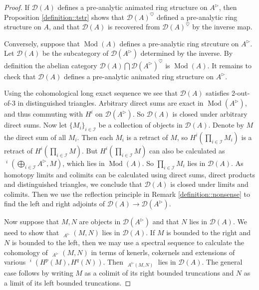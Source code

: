 \documentclass{article}
\theoremstyle{plain}
\theoremstyle{definition}
\theoremstyle{remark}
\DeclareMathOperator{\rhoms}{\underline{RHom}}
\DeclareMathOperator{\modcat}{Mod}
\DeclareMathOperator{\exts}{\underline{Ext}}
\newcommand{\huflag}{\triangleright}
\newcommand{\D}{\mathcal{D}}
\newcommand{\heart}{\heartsuit}
\begin{document}
\begin{proof}
If $ \D (A) $ defines a pre-analytic animated ring structure on $ A ^{\huflag} $, then Proposition \ref{definition::tstr}
shows that $ \D (A)^{\heart} $ defined a pre-analytic ring structure on $ A $,
and that $ \D (A) $ is recovered from $ \D (A)^{\heart} $ by the inverse map.

Conversely, suppose that $ \modcat (A) $ defines a pre-analytic ring strcuture on $ A ^{\huflag} $.
Let $ \D (A) $ be the subcategory of $ \D (A ^{\huflag}) $ determined by the inverse.
By definition the abelian category $ \D (A) \bigcap \D (A ^{\huflag})^{\heart} $ is $ \modcat (A) $.
It remains to check that $ \D (A) $ defines a pre-analytic animated ring structure on $ A ^{\huflag} $.

Using the cohomological long exact sequence we see that $ \D (A) $ satisfies 2-out-of-3 in distinguished triangles.
Arbitrary direct sums are exact in $ \modcat (A ^{\huflag}) $, and thus commuting with $ H ^{i} $ on $ \D (A ^{\huflag}) $.
So $ \D (A) $ is closed under arbitrary direct sums.
Now let $ \{M _{i}\}_{i\in \mathcal{I}} $ be a collection of objects in $ \D (A) $.
Denote by $ M $ the direct sum of all $ M _{i} $.
Then each $ M _{i} $ is a retract of $ M $, so $ H ^{i}(\prod _{i\in \mathcal{I}} M _{i}) $
is a retract of $ H ^{i}(\prod _{i\in \mathcal{I}} M) $.
But $ H ^{i}(\prod _{i\in \mathcal{I}} M) $ can also be calculated as $ \exts ^{i}(\bigoplus _{i\in \mathcal{I}} A ^{\huflag}, M) $,
which lies in $ \modcat (A) $. So $ \prod _{i\in \mathcal{I}} M _{i} $ lies in $ \D (A) $.
As homotopy limits and colimits can be calculated using direct sums, direct products and distinguished triangles,
we conclude that $ \D (A) $ is closed under limits and colimits.
Then we use the reflection principle in Remark \ref{definition::nonsense} to find the left and right adjoints of $ \D (A)\to \D (A ^{\huflag}) $.

Now suppose that $ M,N $ are objects in $ \D (A ^{\huflag}) $ and that $ N $ lies in $ \D (A) $.
We need to show that $ \rhoms _{A ^{\huflag}}(M, N) $ lies in $ \D (A) $.
If $ M $ is bounded to the right and $ N $ is bounded to the left, then we may use a spectral sequence to calculate the cohomology of
$ \rhoms _{A ^{\huflag}}(M, N) $ in terms of kenerls, cokernels and extensions of various $ \exts ^{i}(H ^{p}(M), H ^{q}(N)) $.
Then $ \rhoms _{A ^{\huflag}(M, N)} $ lies in $ \D (A) $.
The general case follows by writing $ M $ as a colimit of its right bounded truncations and $ N $ as a limit of its left bounded truncations.


\end{proof}
\end{document}
